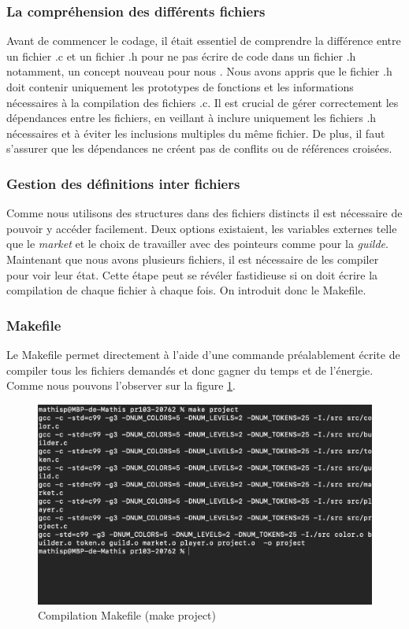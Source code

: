\documentclass{article}
\begin{document}
\subsubsection{La compréhension des différents fichiers}

\hspace{1em} Avant de commencer le codage, il était essentiel de comprendre la différence entre un fichier .c et un fichier .h pour ne pas écrire de code dans un fichier .h notamment, un concept nouveau pour nous . Nous avons appris que le fichier .h doit contenir uniquement les prototypes de fonctions et les informations nécessaires à la compilation des fichiers .c. Il est crucial de gérer correctement les dépendances entre les fichiers, en veillant à inclure uniquement les fichiers .h nécessaires et à éviter les inclusions multiples du même fichier. De plus, il faut s'assurer que les dépendances ne créent pas de conflits ou de références croisées.


\subsubsection{Gestion des définitions inter fichiers}

\vspace{1em}
\hspace{1em} Comme nous utilisons des structures dans des fichiers distincts il est nécessaire de pouvoir y accéder facilement. Deux options existaient, les variables externes telle que le \emph{market} et le choix de travailler avec des pointeurs comme pour la \emph{guilde}.\\ 

Maintenant que nous avons plusieurs fichiers, il est nécessaire de les compiler pour voir leur état. Cette étape peut se révéler fastidieuse si on doit écrire la compilation de chaque fichier à chaque fois. On introduit donc le Makefile.

\subsubsection{Makefile}

\hspace{1em} Le Makefile permet directement à l'aide d'une commande préalablement écrite de compiler tous les fichiers demandés et donc gagner du temps et de l'énergie. Comme nous pouvons l'observer sur la figure \ref{fig:project}.
\begin{figure}[ht]
    \centering
    \includegraphics[width=0.40\linewidth]{Make Project.png}
    \caption{Compilation Makefile (make project)}
    \label{fig:project}
\end{figure}
\end{document}
